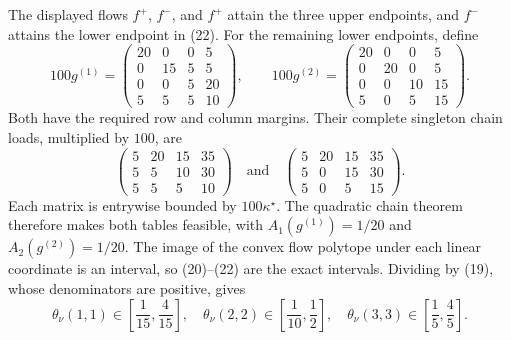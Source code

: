 The displayed flows \(f^+\), \(f^-\), and \(f^+\) attain the three upper endpoints, and \(f^-\) attains the lower endpoint in (22).  For the remaining lower endpoints, define
\[
100g^{(1)}=
\begin{pmatrix}
20&0&0&5\\0&15&5&5\\0&0&5&20\\5&5&5&10
\end{pmatrix},\qquad
100g^{(2)}=
\begin{pmatrix}
20&0&0&5\\0&20&0&5\\0&0&10&15\\5&0&5&15
\end{pmatrix}.
\]
Both have the required row and column margins.  Their complete singleton chain loads, multiplied by \(100\), are
\[
\begin{pmatrix}5&20&15&35\\5&5&10&30\\5&5&5&10\end{pmatrix}
\quad\text{and}\quad
\begin{pmatrix}5&20&15&35\\5&0&15&30\\5&0&5&15\end{pmatrix}.
\]
Each matrix is entrywise bounded by \(100\kappa^\star\).  The quadratic chain theorem therefore makes both tables feasible, with \(A_1(g^{(1)})=1/20\) and \(A_2(g^{(2)})=1/20\).  The image of the convex flow polytope under each linear coordinate is an interval, so (20)--(22) are the exact intervals.  Dividing by (19), whose denominators are positive, gives
\[
\theta_\nu(1,1)\in\left[\frac1{15},\frac4{15}\right],\quad
\theta_\nu(2,2)\in\left[\frac1{10},\frac12\right],\quad
\theta_\nu(3,3)\in\left[\frac15,\frac45\right].                   \tag{23}
\]

